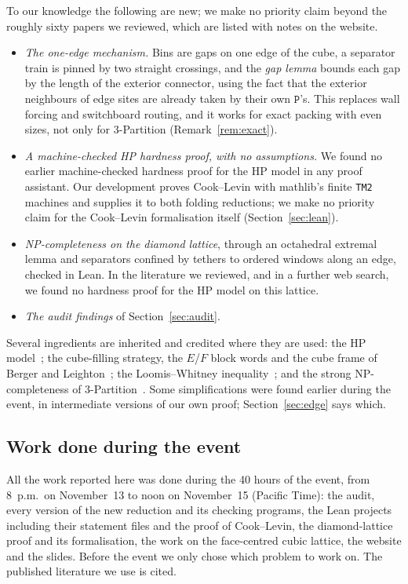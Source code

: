 \documentclass[11pt,letterpaper]{article}
\theoremstyle{definition}
\theoremstyle{remark}
\newcommand{\Pp}{\mathtt{P}}
\newcommand{\lean}[1]{\texttt{#1}}
\begin{document}
To our knowledge the following are new; we make no priority claim beyond the roughly sixty papers
we reviewed, which are listed with notes on the website.
\begin{itemize}
  \item \emph{The one-edge mechanism.} Bins are gaps on one edge of the cube, a separator train is
    pinned by two straight crossings, and the \emph{gap lemma} bounds each gap by the length of the
    exterior connector, using the fact that the exterior neighbours of edge sites are already taken
    by their own $\Pp$'s. This replaces wall forcing and switchboard routing, and it works for exact
    packing with even sizes, not only for 3-Partition (Remark~\ref{rem:exact}).
  \item \emph{A machine-checked HP hardness proof, with no assumptions.} We found no earlier
    machine-checked hardness proof for the HP model in any proof assistant. Our development proves
    Cook--Levin with mathlib's finite \lean{TM2} machines and supplies it to both folding reductions;
    we make no priority claim for the Cook--Levin formalisation itself (Section~\ref{sec:lean}).
  \item \emph{NP-completeness on the diamond lattice}, through an octahedral extremal lemma and
    separators confined by tethers to ordered windows along an edge, checked in Lean. In the literature we reviewed, and
    in a further web search, we found no hardness proof for the HP model on this lattice.
  \item \emph{The audit findings} of Section~\ref{sec:audit}.
\end{itemize}
Several ingredients are inherited and credited where they are used: the HP model~\cite{Dill85}; the
cube-filling strategy, the $E$/$F$ block words and the cube frame of Berger and
Leighton~\cite{BL98}; the Loomis--Whitney inequality~\cite{LW49}; and the strong NP-completeness of
3-Partition~\cite{GJ79}. Some simplifications were found earlier during the event, in intermediate
versions of our own proof; Section~\ref{sec:edge} says which.

\subsection{Work done during the event}

All the work reported here was done during the 40 hours of the event, from 8~p.m.\ on
November~13 to noon on November~15 (Pacific Time): the audit, every version of the new reduction
and its checking programs, the Lean projects including their statement files and the proof of
Cook--Levin, the diamond-lattice proof and its formalisation, the work on the face-centred cubic
lattice, the website and the slides. Before the event we only chose
which problem to work on. The published literature we use is cited.
\end{document}
